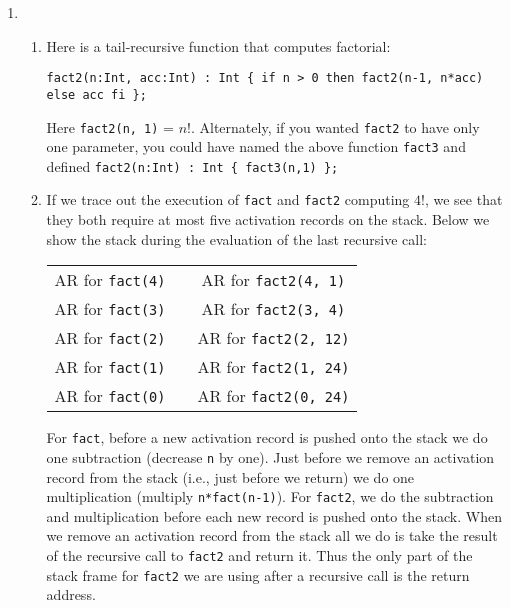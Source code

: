 \documentclass{article}
\begin{document}

\begin{enumerate}

\item 
\begin{enumerate}
\item Here is a tail-recursive function that computes factorial:
\begin{verbatim}
fact2(n:Int, acc:Int) : Int { if n > 0 then fact2(n-1, n*acc) else acc fi };
\end{verbatim}
Here \verb'fact2(n, 1)' = $n!$.  Alternately, if you wanted
\verb'fact2' to have only one parameter, you could have named the
above function \verb'fact3' and defined
\verb'fact2(n:Int) : Int { fact3(n,1) };'

\item If we trace out the execution of \verb'fact' and \verb'fact2'
computing $4!$, we see that they both require at most five activation
records on the stack.  Below we show the stack during the evaluation
of the last recursive call:

\begin{center}
\begin{tabular}{|c|c|c|} 
\cline{1-1} \cline{3-3}
AR for \verb'fact(4)' & \hspace*{1in} & AR for \verb'fact2(4, 1)' \\
\cline{1-1} \cline{3-3}
AR for \verb'fact(3)' && AR for \verb'fact2(3, 4)' \\
\cline{1-1} \cline{3-3}
AR for \verb'fact(2)' && AR for \verb'fact2(2, 12)' \\
\cline{1-1} \cline{3-3}
AR for \verb'fact(1)' && AR for \verb'fact2(1, 24)' \\
\cline{1-1} \cline{3-3}
AR for \verb'fact(0)' && AR for \verb'fact2(0, 24)' \\
\cline{1-1} \cline{3-3}
\end{tabular}
\end{center}

For \verb'fact', before a new activation record is pushed onto the
stack we do one subtraction (decrease \texttt{n} by one).  Just before
we remove an activation record from the stack (i.e., just before we
return) we do one multiplication (multiply \texttt{n*fact(n-1)}).  For
\verb'fact2', we do the subtraction and multiplication before each new
record is pushed onto the stack.  When we remove an activation record
from the stack all we do is take the result of the recursive call to
\verb'fact2' and return it.  Thus the only part of the stack frame for
\verb'fact2' we are using after a recursive call is the return
address.


\end{enumerate}
\end{enumerate}
\end{document}

